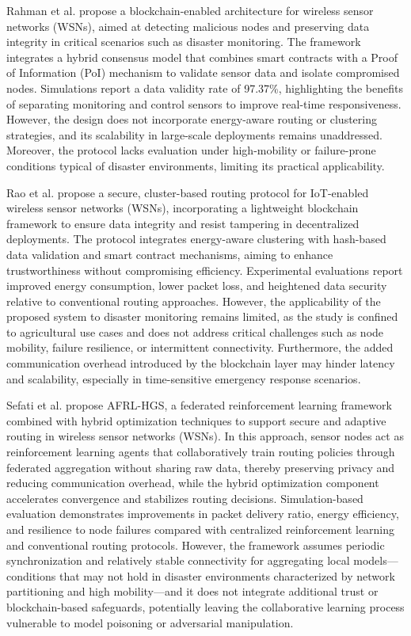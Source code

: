 \documentclass[12pt, onecolumn, journal]{IEEEtran}
\begin{document}
Rahman et al. \cite{rahman_distributed_2025} propose a blockchain-enabled architecture for wireless sensor networks (WSNs), aimed at detecting malicious nodes and preserving data integrity in critical scenarios such as disaster monitoring. The framework integrates a hybrid consensus model that combines smart contracts with a Proof of Information (PoI) mechanism to validate sensor data and isolate compromised nodes. Simulations report a data validity rate of 97.37\%, highlighting the benefits of separating monitoring and control sensors to improve real-time responsiveness. However, the design does not incorporate energy-aware routing or clustering strategies, and its scalability in large-scale deployments remains unaddressed. Moreover, the protocol lacks evaluation under high-mobility or failure-prone conditions typical of disaster environments, limiting its practical applicability.

Rao et al. \cite{rao_optimized_2024} propose a secure, cluster-based routing protocol for IoT-enabled wireless sensor networks (WSNs), incorporating a lightweight blockchain framework to ensure data integrity and resist tampering in decentralized deployments. The protocol integrates energy-aware clustering with hash-based data validation and smart contract mechanisms, aiming to enhance trustworthiness without compromising efficiency. Experimental evaluations report improved energy consumption, lower packet loss, and heightened data security relative to conventional routing approaches. However, the applicability of the proposed system to disaster monitoring remains limited, as the study is confined to agricultural use cases and does not address critical challenges such as node mobility, failure resilience, or intermittent connectivity. Furthermore, the added communication overhead introduced by the blockchain layer may hinder latency and scalability, especially in time-sensitive emergency response scenarios.

Sefati et al. \cite{sefati_federated_2025} propose AFRL-HGS, a federated reinforcement learning framework combined with hybrid optimization techniques to support secure and adaptive routing in wireless sensor networks (WSNs). In this approach, sensor nodes act as reinforcement learning agents that collaboratively train routing policies through federated aggregation without sharing raw data, thereby preserving privacy and reducing communication overhead, while the hybrid optimization component accelerates convergence and stabilizes routing decisions. Simulation-based evaluation demonstrates improvements in packet delivery ratio, energy efficiency, and resilience to node failures compared with centralized reinforcement learning and conventional routing protocols. However, the framework assumes periodic synchronization and relatively stable connectivity for aggregating local models—conditions that may not hold in disaster environments characterized by network partitioning and high mobility—and it does not integrate additional trust or blockchain-based safeguards, potentially leaving the collaborative learning process vulnerable to model poisoning or adversarial manipulation.
\end{document}
